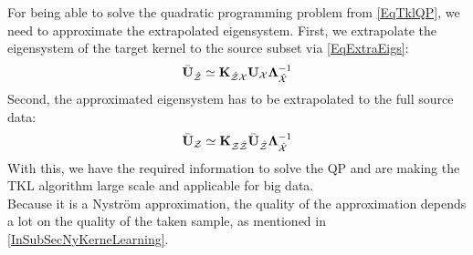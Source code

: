 For being able to solve the quadratic programming problem from \eqref{EqTklQP}, we need to approximate the extrapolated eigensystem.
First, we extrapolate the eigensystem of the target kernel to the source subset via \eqref{EqExtraEigs}:
\begin{equation}
\bar{\mathbf{U}}_\mathcal{\hat{Z}}\simeq\mathbf{K}_{\mathcal{\hat{Z}X}}\mathbf{U}_{\mathcal{X}}\boldsymbol{\Lambda}_\mathcal{\hat{X}}^{-1}
\end{equation}
Second, the approximated eigensystem has to be extrapolated to the full source data:
\begin{equation}
\bar{\mathbf{U}}_\mathcal{Z} \simeq \mathbf{K}_{\mathcal{Z\hat{Z}}}\bar{\mathbf{U}}_\mathcal{\hat{Z}}\boldsymbol{\Lambda}_\mathcal{\hat{X}}^{-1}
\end{equation}
With this, we have the required information to solve the \acl{QP} and are making the \acs{TKL} algorithm large scale and applicable for big data.\cite{Long.2015}\\
Because it is a Nyström approximation, the quality of the approximation depends a lot on the quality of the taken sample, as mentioned in \ref{InSubSecNyKerneLearning}.